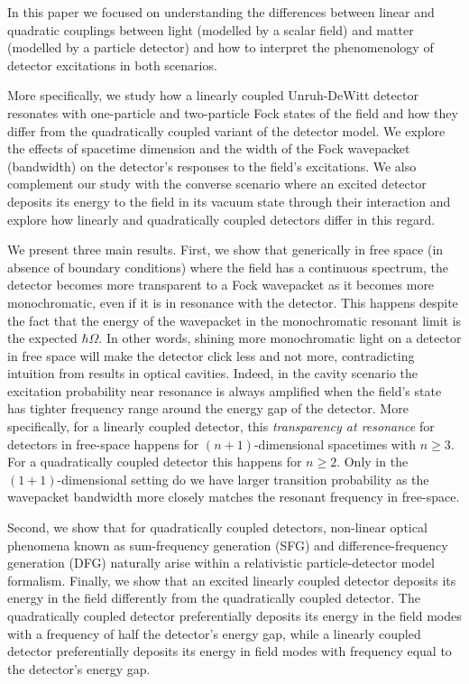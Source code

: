 \documentclass[11pt,prd,onecolumn,superscriptaddress,nofootinbib,floatfix,amsmath,amssymb]{revtex4-2}
\begin{document}
    
    
    
    
    
    
    
    In this paper we focused on understanding the differences between linear and quadratic couplings between light (modelled by a scalar field) and matter (modelled by a particle detector) and how to interpret the phenomenology of detector excitations in both scenarios.
    
    More specifically, we study how a linearly coupled Unruh-DeWitt detector resonates with one-particle and two-particle Fock states of the field and how they differ from the quadratically coupled variant of the detector model. We explore the effects of spacetime dimension and the width of the Fock wavepacket (bandwidth) on the detector's responses to the field's excitations. We also complement our study with the converse scenario where an excited detector deposits its energy to the field in its vacuum state through their interaction and explore how linearly and quadratically coupled detectors differ in this regard.
    
    We present three main results. First, we show that generically in free space (in absence of boundary conditions) where the field has a continuous spectrum, the detector becomes more transparent to a Fock wavepacket as it becomes more monochromatic, even if it is in resonance with the detector. This happens despite the fact that the energy of the wavepacket in the monochromatic resonant limit is the expected $\hbar \Omega$. In other words, shining more monochromatic light on a detector in free space will make the detector click less and not more, contradicting intuition from results in optical cavities. Indeed, in the cavity  scenario the excitation probability near resonance is always amplified when the field's state has tighter frequency range around the energy gap of the detector. More specifically, for a linearly coupled detector, this \textit{transparency at resonance} for detectors in free-space happens for $(n+1)$-dimensional spacetimes with $n\geq 3$. For a quadratically coupled detector this happens for $n\geq 2$. Only in the $(1+1)$-dimensional setting do we have larger transition probability as the wavepacket bandwidth more closely matches the resonant frequency in free-space.
    
    Second, we show that for quadratically coupled detectors, non-linear optical phenomena known as sum-frequency generation (SFG) and difference-frequency generation (DFG) naturally arise within a relativistic particle-detector model formalism. Finally, we show that an excited linearly coupled detector deposits its energy in the field differently from the quadratically coupled detector. The quadratically coupled detector preferentially deposits its energy in the field modes with a frequency of {half} the detector's energy gap, while a linearly coupled detector preferentially deposits its energy in field modes with frequency equal to the detector's energy gap.
    
\end{document}

